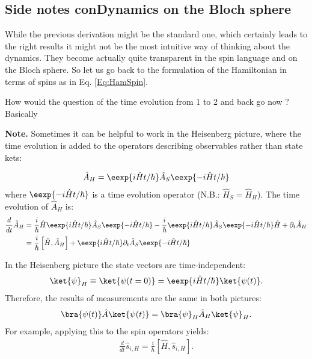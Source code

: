 \subsection{Side notes conDynamics on the Bloch sphere}

While the previous derivation might be the standard one, which certainly leads to the right results it might not be the most intuitive way of thinking about the dynamics. They become actually quite transparent in the spin language and on the Bloch sphere. So let us go back to the formulation of the Hamiltonian in terms of spins as in Eq. \eqref{Eq:HamSpin}.

How would the question of the time evolution from $1$ to 2 and back go now ? Basically

\textbf{Note.} Sometimes it can be helpful to work in the Heisenberg picture, where the time evolution is added to the operators describing observables rather than state kets:

\begin{align}
	\hat{A}_H=\eexp{i{\hat{H} t}/{\hbar}} \hat{A}_S \eexp{-i{\hat{H} t}/{\hbar}}
\end{align}
where $\eexp{-i{\hat{H} t}/{\hbar}}$ is a time evolution operator (N.B.: $\hat{H}_S = \hat{H}_H$). The time evolution of $\hat{A}_H$ is:
\begin{align}
 \notag \frac{d}{dt} \hat{A}_H &= \frac{i}{\hbar}\hat{H}\eexp{i{\hat{H}t}/{\hbar}}\hat{A}_S \eexp{-i{\hat{H} t}/{\hbar}}-\frac{i}{\hbar} \eexp{i{\hat{H} t}/{\hbar}}\hat{A}_S \eexp{-i{\hat{H}t}/{\hbar}}\hat{H}+\partial_t\hat{A}_H\\
&= \frac{i}{\hbar}\left[\hat{H},\hat{A}_H\right] + \eexp{i{\hat{H}t}/{\hbar}}\partial_t\hat{A}_S\eexp{-i{\hat{H}t}/{\hbar}}
 \end{align}

In the Heisenberg picture the state vectors are time-in\-de\-pen\-dent:
\begin{align}
	\ket{\psi}_H \equiv \ket{\psi(t=0)}=\eexp{i{\hat{H}}t/{\hbar}} \ket{\psi(t)}.
\end{align}
Therefore, the results of measurements are the same in both pictures:
\begin{align}
\bra{\psi(t)}\hat{A}\ket{\psi(t)} = \bra{\psi}_H \hat{A}_H \ket{\psi}_H.
\end{align}
For example, applying this to the spin operators yields:
\begin{align}						\frac{d}{dt}\hat{s}_{i,H}=\frac{i}{\hbar}\left[\hat{H},\hat{s}_{i,H}\right].
\end{align}